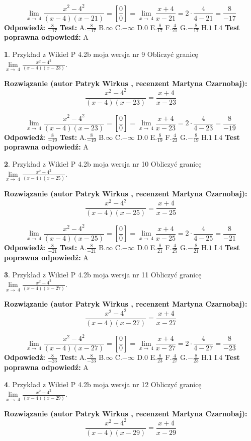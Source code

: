 \documentclass[12pt, a4paper]{article}
\theoremstyle{definition} %
\newtheorem{zad}{}
\newcommand{\zadStart}[1]{\begin{zad}#1\newline}
\newcommand{\zadStop}{\end{zad}}
\newcommand{\rozwStart}[2]{\noindent \textbf{Rozwiązanie (autor #1 , recenzent #2): }\newline}
\newcommand{\rozwStop}{\newline}
\newcommand{\odpStart}{\noindent \textbf{Odpowiedź:}\newline}
\newcommand{\odpStop}{\newline}
\newcommand{\testStart}{\noindent \textbf{Test:}\newline}
\newcommand{\testStop}{\newline}
\newcommand{\kluczStart}{\noindent \textbf{Test poprawna odpowiedź:}\newline}
\newcommand{\kluczStop}{\newline}
\begin{document}
$$\lim\limits_{x\to\ 4}\frac{x^{2}-4^{2}}{(x-4)(x-21)}=[\frac{0}{0}]=\lim\limits_{x\to\ 4}\frac{x+4}{x-21}=2 \cdot \frac{4}{4-21} = \frac{8}{-17}$$
\rozwStop
\odpStart
$\frac{8}{-17}$
\odpStop
\testStart
A.$\frac{8}{-17}$
B.$\infty$
C.$-\infty$
D.$0$
E.$\frac{8}{17}$
F.$\frac{4}{21}$
G.$-\frac{8}{17}$
H.$1$
I.$4$
\testStop
\kluczStart
A
\kluczStop



\zadStart{Przykład z Wikieł P 4.2b moja wersja nr 9}
Obliczyć granicę $\lim\limits_{x\to\ 4}\frac{x^{2}-4^{2}}{(x-4)(x-23)}$.
\zadStop
\rozwStart{Patryk Wirkus}{Martyna Czarnobaj}
$$\frac{x^{2}-4^{2}}{(x-4)(x-23)}=\frac{x+4}{x-23}$$

$$\lim\limits_{x\to\ 4}\frac{x^{2}-4^{2}}{(x-4)(x-23)}=[\frac{0}{0}]=\lim\limits_{x\to\ 4}\frac{x+4}{x-23}=2 \cdot \frac{4}{4-23} = \frac{8}{-19}$$
\rozwStop
\odpStart
$\frac{8}{-19}$
\odpStop
\testStart
A.$\frac{8}{-19}$
B.$\infty$
C.$-\infty$
D.$0$
E.$\frac{8}{19}$
F.$\frac{4}{23}$
G.$-\frac{8}{19}$
H.$1$
I.$4$
\testStop
\kluczStart
A
\kluczStop



\zadStart{Przykład z Wikieł P 4.2b moja wersja nr 10}
Obliczyć granicę $\lim\limits_{x\to\ 4}\frac{x^{2}-4^{2}}{(x-4)(x-25)}$.
\zadStop
\rozwStart{Patryk Wirkus}{Martyna Czarnobaj}
$$\frac{x^{2}-4^{2}}{(x-4)(x-25)}=\frac{x+4}{x-25}$$

$$\lim\limits_{x\to\ 4}\frac{x^{2}-4^{2}}{(x-4)(x-25)}=[\frac{0}{0}]=\lim\limits_{x\to\ 4}\frac{x+4}{x-25}=2 \cdot \frac{4}{4-25} = \frac{8}{-21}$$
\rozwStop
\odpStart
$\frac{8}{-21}$
\odpStop
\testStart
A.$\frac{8}{-21}$
B.$\infty$
C.$-\infty$
D.$0$
E.$\frac{8}{21}$
F.$\frac{4}{25}$
G.$-\frac{8}{21}$
H.$1$
I.$4$
\testStop
\kluczStart
A
\kluczStop



\zadStart{Przykład z Wikieł P 4.2b moja wersja nr 11}
Obliczyć granicę $\lim\limits_{x\to\ 4}\frac{x^{2}-4^{2}}{(x-4)(x-27)}$.
\zadStop
\rozwStart{Patryk Wirkus}{Martyna Czarnobaj}
$$\frac{x^{2}-4^{2}}{(x-4)(x-27)}=\frac{x+4}{x-27}$$

$$\lim\limits_{x\to\ 4}\frac{x^{2}-4^{2}}{(x-4)(x-27)}=[\frac{0}{0}]=\lim\limits_{x\to\ 4}\frac{x+4}{x-27}=2 \cdot \frac{4}{4-27} = \frac{8}{-23}$$
\rozwStop
\odpStart
$\frac{8}{-23}$
\odpStop
\testStart
A.$\frac{8}{-23}$
B.$\infty$
C.$-\infty$
D.$0$
E.$\frac{8}{23}$
F.$\frac{4}{27}$
G.$-\frac{8}{23}$
H.$1$
I.$4$
\testStop
\kluczStart
A
\kluczStop



\zadStart{Przykład z Wikieł P 4.2b moja wersja nr 12}
Obliczyć granicę $\lim\limits_{x\to\ 4}\frac{x^{2}-4^{2}}{(x-4)(x-29)}$.
\zadStop
\rozwStart{Patryk Wirkus}{Martyna Czarnobaj}
$$\frac{x^{2}-4^{2}}{(x-4)(x-29)}=\frac{x+4}{x-29}$$
\end{document}
